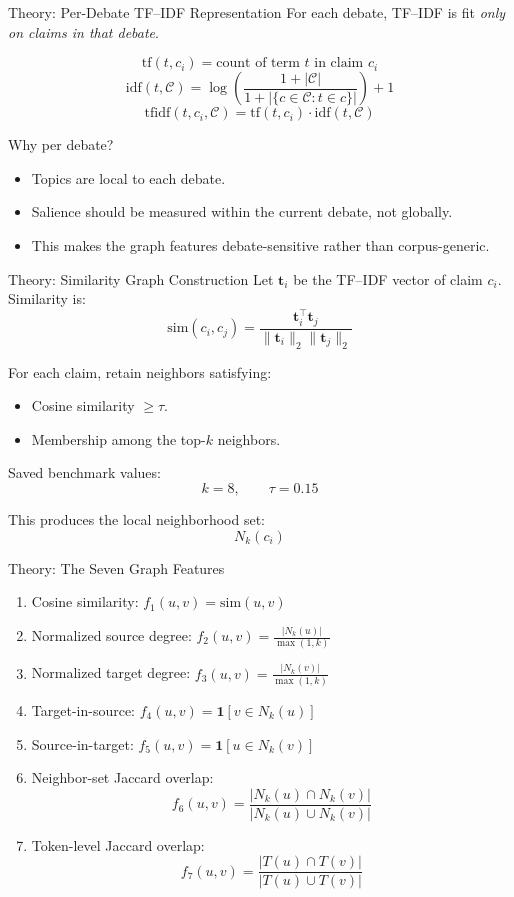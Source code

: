 \documentclass[aspectratio=169]{beamer}
\begin{document}
\begin{frame}[shrink=4]{Theory: Per-Debate TF--IDF Representation}
For each debate, TF--IDF is fit \emph{only on claims in that debate}.

\[
\mathrm{tf}(t,c_i) = \text{count of term } t \text{ in claim } c_i
\]
\[
\mathrm{idf}(t,\mathcal{C}) = \log\left(\frac{1 + |\mathcal{C}|}{1 + |\{c \in \mathcal{C}: t \in c\}|}\right)+1
\]
\[
\mathrm{tfidf}(t,c_i,\mathcal{C}) = \mathrm{tf}(t,c_i)\cdot \mathrm{idf}(t,\mathcal{C})
\]

Why per debate?
\begin{itemize}
  \item Topics are local to each debate.
  \item Salience should be measured within the current debate, not globally.
  \item This makes the graph features debate-sensitive rather than corpus-generic.
\end{itemize}
\end{frame}

\begin{frame}[shrink=3]{Theory: Similarity Graph Construction}
Let \(\mathbf{t}_i\) be the TF--IDF vector of claim \(c_i\). Similarity is:
\[
\mathrm{sim}(c_i,c_j)
=
\frac{\mathbf{t}_i^\top \mathbf{t}_j}{\|\mathbf{t}_i\|_2\|\mathbf{t}_j\|_2}
\]

For each claim, retain neighbors satisfying:
\begin{itemize}
  \item Cosine similarity \(\ge \tau\).
  \item Membership among the top-\(k\) neighbors.
\end{itemize}

Saved benchmark values:
\[
k = 8, \qquad \tau = 0.15
\]

This produces the local neighborhood set:
\[
N_k(c_i)
\]
\end{frame}

\begin{frame}[shrink=8]{Theory: The Seven Graph Features}
\small
\begin{enumerate}
  \item Cosine similarity: \(f_1(u,v)=\mathrm{sim}(u,v)\)
  \item Normalized source degree: \(f_2(u,v)=\frac{|N_k(u)|}{\max(1,k)}\)
  \item Normalized target degree: \(f_3(u,v)=\frac{|N_k(v)|}{\max(1,k)}\)
  \item Target-in-source: \(f_4(u,v)=\mathbf{1}[v \in N_k(u)]\)
  \item Source-in-target: \(f_5(u,v)=\mathbf{1}[u \in N_k(v)]\)
  \item Neighbor-set Jaccard overlap:
  \[
  f_6(u,v)=\frac{|N_k(u)\cap N_k(v)|}{|N_k(u)\cup N_k(v)|}
  \]
  \item Token-level Jaccard overlap:
  \[
  f_7(u,v)=\frac{|T(u)\cap T(v)|}{|T(u)\cup T(v)|}
  \]
\end{enumerate}
\normalsize
\end{frame}
\end{document}
